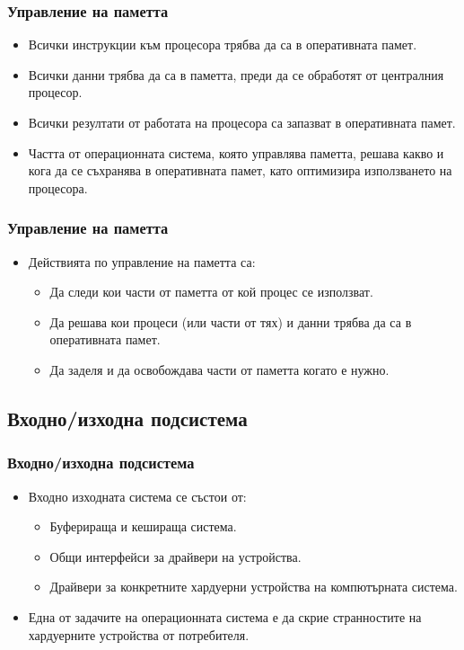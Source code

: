 \documentclass[ignorenonframetext, hyperref=unicode]{beamer}
\begin{document}
\begin{frame}
\frametitle{Управление на паметта}
\begin{itemize}
\item Всички инструкции към процесора трябва да са в оперативната памет.
\item Всички данни трябва да са в паметта,
преди да се обработят от централния процесор.
\item Всички резултати от работата на процесора са запазват в оперативната
памет.
\item Частта от операционната система, която управлява паметта, решава какво и
кога да се съхранява в оперативната памет, като оптимизира използването на
процесора.
\end{itemize}
\end{frame}

\begin{frame}
\frametitle{Управление на паметта}
\begin{itemize}
\item Действията по управление на паметта са:
\begin{itemize}
  \item Да следи кои части от паметта от кой процес се използват.
  \item Да решава кои процеси (или части от тях) и данни трябва да са в
  оперативната памет.
  \item Да заделя и да освобождава части от паметта когато е нужно.
\end{itemize}
\end{itemize}
\end{frame}




\subsection{Входно/изходна подсистема}

\begin{frame}
\frametitle{Входно/изходна подсистема}
\begin{itemize}
\item Входно изходната система се състои от:
\begin{itemize}
  \item Буферираща и кешираща система.
  \item Общи интерфейси за драйвери на устройства.
  \item Драйвери за конкретните хардуерни устройства на компютърната система.
\end{itemize}
\item Една от задачите на операционната система е да скрие странностите на
хардуерните устройства от потребителя.
\end{itemize}
\end{frame}
\end{document}
